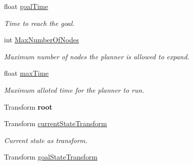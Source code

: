 \begin{DoxyCompactItemize}
\item 
\hypertarget{class_planner_a61bc5fb92926adb1d47117b3953dc838}{float \hyperlink{class_planner_a61bc5fb92926adb1d47117b3953dc838}{goal\-Time}}\label{class_planner_a61bc5fb92926adb1d47117b3953dc838}

\begin{DoxyCompactList}\small\item\em Time to reach the goal. \end{DoxyCompactList}\item 
\hypertarget{class_planner_a11545a956f32850f9bee31866e6c1854}{int \hyperlink{class_planner_a11545a956f32850f9bee31866e6c1854}{Max\-Number\-Of\-Nodes}}\label{class_planner_a11545a956f32850f9bee31866e6c1854}

\begin{DoxyCompactList}\small\item\em Maximum number of nodes the planner is allowed to expand. \end{DoxyCompactList}\item 
\hypertarget{class_planner_a25d7f8ac309c61b0c1f161c36b771a6d}{float \hyperlink{class_planner_a25d7f8ac309c61b0c1f161c36b771a6d}{max\-Time}}\label{class_planner_a25d7f8ac309c61b0c1f161c36b771a6d}

\begin{DoxyCompactList}\small\item\em Maximum alloted time for the planner to run. \end{DoxyCompactList}\item 
\hypertarget{class_planner_a935d9d44e2bf7cfb086aef8a4a272893}{Transform {\bfseries root}}\label{class_planner_a935d9d44e2bf7cfb086aef8a4a272893}

\item 
\hypertarget{class_planner_a15508936d815ce9a6cd111428e6ed819}{Transform \hyperlink{class_planner_a15508936d815ce9a6cd111428e6ed819}{current\-State\-Transform}}\label{class_planner_a15508936d815ce9a6cd111428e6ed819}

\begin{DoxyCompactList}\small\item\em Current state as transform. \end{DoxyCompactList}\item 
\hypertarget{class_planner_a30a77ede048aecc823adc2775718df2a}{Transform \hyperlink{class_planner_a30a77ede048aecc823adc2775718df2a}{goal\-State\-Transform}}\label{class_planner_a30a77ede048aecc823adc2775718df2a}


\end{DoxyCompactItemize}
